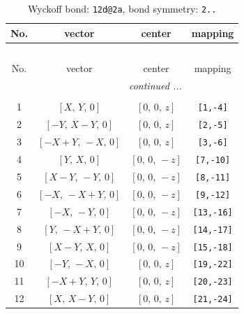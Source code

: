 \documentclass[fleqn,8pt]{jsarticle}
\begin{document}
\begin{longtable}{cccc}
\caption{Wyckoff bond: {\tt 12d@2a}, bond symmetry: {\tt 2..}}
 \\
 \hline \hline
No. & vector & center & mapping \\ \hline \endfirsthead

\multicolumn{3}{l}{\tablename\ \thetable{}} \\
 \hline \hline
No. & vector & center & mapping \\ \hline \endhead

 \hline \hline
\multicolumn{3}{r}{\footnotesize\it continued ...} \\ \endfoot

 \hline \hline
\multicolumn{3}{r}{} \\ \endlastfoot

1 & $\left[ X,\, Y,\, 0 \right]$ & $\left[ 0,\, 0,\, z \right]$ & {\tt [1,-4]} \\ \hline
2 & $\left[ - Y,\, X - Y,\, 0 \right]$ & $\left[ 0,\, 0,\, z \right]$ & {\tt [2,-5]} \\ \hline
3 & $\left[ - X + Y,\, - X,\, 0 \right]$ & $\left[ 0,\, 0,\, z \right]$ & {\tt [3,-6]} \\ \hline
4 & $\left[ Y,\, X,\, 0 \right]$ & $\left[ 0,\, 0,\, - z \right]$ & {\tt [7,-10]} \\ \hline
5 & $\left[ X - Y,\, - Y,\, 0 \right]$ & $\left[ 0,\, 0,\, - z \right]$ & {\tt [8,-11]} \\ \hline
6 & $\left[ - X,\, - X + Y,\, 0 \right]$ & $\left[ 0,\, 0,\, - z \right]$ & {\tt [9,-12]} \\ \hline
7 & $\left[ - X,\, - Y,\, 0 \right]$ & $\left[ 0,\, 0,\, - z \right]$ & {\tt [13,-16]} \\ \hline
8 & $\left[ Y,\, - X + Y,\, 0 \right]$ & $\left[ 0,\, 0,\, - z \right]$ & {\tt [14,-17]} \\ \hline
9 & $\left[ X - Y,\, X,\, 0 \right]$ & $\left[ 0,\, 0,\, - z \right]$ & {\tt [15,-18]} \\ \hline
10 & $\left[ - Y,\, - X,\, 0 \right]$ & $\left[ 0,\, 0,\, z \right]$ & {\tt [19,-22]} \\ \hline
11 & $\left[ - X + Y,\, Y,\, 0 \right]$ & $\left[ 0,\, 0,\, z \right]$ & {\tt [20,-23]} \\ \hline
12 & $\left[ X,\, X - Y,\, 0 \right]$ & $\left[ 0,\, 0,\, z \right]$ & {\tt [21,-24]} \\
\end{longtable}
\renewcommand{\arraystretch}{1.2}
\end{document}
